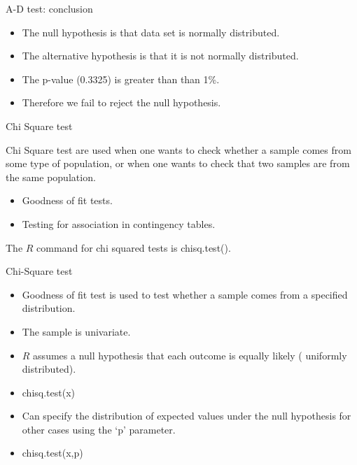 \documentclass[a4paper,12pt]{article}
\begin{document}

{A-D test: conclusion}
\begin{itemize}
	\item The null hypothesis is that data set is normally distributed.
	\item The alternative hypothesis is that it is not normally distributed.
	\item The p-value (0.3325) is greater than than 1\%.
	\item Therefore we fail to reject the null hypothesis.
\end{itemize}


{Chi Square test}

Chi Square test are used when one wants to check whether a sample comes from some type of population,
or when one wants to check that two samples are from the same population.

\begin{itemize}
	\item Goodness of fit tests.
	\item Testing for association in contingency tables.
\end{itemize}

The $R$ command for chi squared tests is chisq.test().



{Chi-Square test}
\begin{itemize}
	\item Goodness of fit test is used to test whether a sample comes from a specified distribution.
	\item The sample is univariate.
	\item $R$ assumes a null hypothesis that each outcome is equally likely ( uniformly distributed).
	\item chisq.test(x)
	\item Can specify the distribution of expected values under the null hypothesis for other cases using the `p' parameter.
	\item chisq.test(x,p)
\end{itemize}
\end{document}
